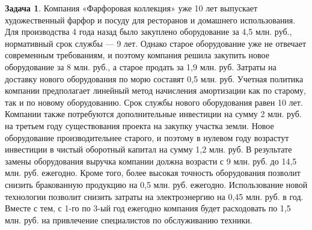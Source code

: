 \documentclass[a4paper, 14pt]{article}
\theoremstyle{plain} %
\theoremstyle{definition} %
\newtheorem{problem}{Задача}[subsection]
\theoremstyle{remark} %
\begin{document}
\begin{problem}
	Компания «Фарфоровая коллекция» уже 10 лет выпускает художественный фарфор и посуду для ресторанов и домашнего использования. Для производства 4 года назад было закуплено оборудование за 4,5 млн. руб., нормативный срок службы --- 9 лет. Однако старое оборудование уже не отвечает современным требованиям, и поэтому компания решила закупить новое оборудование за 8 млн. руб., а старое продать за 1,9 млн. руб. Затраты на доставку  нового  оборудования  по  морю  составят  0,5  млн.  руб. Учетная  политика компании предполагает линейный метод начисления амортизации как по старому, так и по новому оборудованию. Срок службы нового оборудования равен 10 лет. Компании также потребуются дополнительные инвестиции на сумму 2 млн. руб. на третьем году существования проекта на закупку участка земли. Новое оборудование производительнее старого, и поэтому в нулевом году возрастут инвестиции в чистый оборотный капитал на сумму  1,2  млн.  руб.  В  результате  замены  оборудования  выручка  компании  должна возрасти с 9 млн. руб. до 14,5 млн. руб. ежегодно. Кроме того, более высокая точность оборудования  позволит  снизить  бракованную  продукцию  на  0,5  млн.  руб. ежегодно. Использование новой технологии позволит снизить затраты на электроэнергию на 0,45 млн. руб. в год. Вместе с тем, с 1-го по 3-ый год ежегодно компания будет расходовать по 1,5 млн. руб. на привлечение специалистов по обслуживанию техники.


\end{problem}
\end{document}
